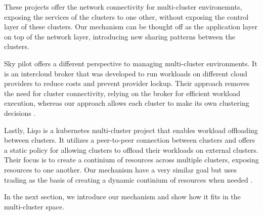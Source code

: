These projects offer the network connectivity for multi-cluster environemnts,
exposing the services of the clusters to one other, without exposing the
control layer of these clusters. Our mechanism can be thought off as the
application layer on top of the network layer, introducing new sharing patterns
between the clusters.

Sky pilot offers a different perspective to managing multi-cluster
environments. It is an intercloud broker that was developed to run workloads on
different cloud providers to reduce costs and prevent provider lockup. Their
approach removes the need for cluster connectivity, relying on the
broker for efficient workload execution, whereas our approach allows each
cluster to make its own clustering decisions \cite{yang_skypilot_nodate}.

Lastly, Liqo is a kubernetes multi-cluster project that enables workload
offloading between clusters. It utilizes a peer-to-peer connection between
clusters and offers a static policy for allowing clusters to offload their
workloads on external clusters. Their focus is to create a continium of
resources across multiple clusters, exposing resources to one another. Our
mechanism have a very similar goal but uses trading as the basis of creating a
dynamic continium of resources when needed \cite{iorio_computing_2023,
noauthor_liqo_nodate}. 

In the next section, we introduce our mechanism and show how it fits in the
multi-cluster space.
